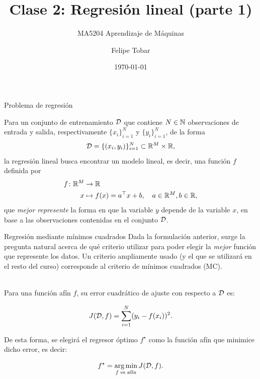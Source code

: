 \documentclass[handout, 9pt]{beamer}
\title{Clase 2: Regresión lineal (parte 1)}
\subtitle{MA5204 Aprendizaje de Máquinas}
\date{\today}
\author{Felipe Tobar}
\institute{Department of Mathematical Engineering \&\\ Center for Mathematical Modelling\\Universidad de Chile}
\begin{document}
\begin{frame}
  \titlepage
\end{frame}


\begin{frame}{Problema de regresión}
	
Para un conjunto de entrenamiento ${\mathcal D}$ que contiene $N\in{\mathbb N}$ observaciones de entrada y salida, respectivamente $\{x_i\}_{i=1}^N$ y $\{y_i\}_{i=1}^N$, de la forma
\begin{equation*}
	{\mathcal D}=\{(x_i,y_i)\}_{i=1}^N\subset \mathbb{R}^M \times \mathbb{R},
	\label{eq:training_set}
\end{equation*}\pause
la regresión lineal busca encontrar un modelo lineal, es decir, una función $f$ definida por 
\begin{align*}
  f \colon \mathbb{R}^M &\to \mathbb{R}\nonumber\\
  x &\mapsto f(x)=a^\top x + b,\quad a\in\mathbb{R}^M,b\in\mathbb{R},
\end{align*}
que \emph{mejor represente} la forma en que la variable $y$ depende de la variable $x$, en base a las observaciones contenidas en el conjunto ${\mathcal D}$.

\end{frame}

\begin{frame}{Regresión mediante mínimos cuadrados}
Dada la formulación anterior, surge la pregunta natural acerca de qué criterio utilizar para poder elegir la \emph{mejor} función que represente los datos. Un criterio ampliamente usado (y el que se utilizará en el resto del curso) corresponde al criterio de mínimos cuadrados (MC).\\~\ \pause

Para una función afín $f$, su error cuadrático de ajuste con respecto a ${\mathcal D}$ es:

\begin{equation*}
	J({\mathcal D},f) = \sum_{i=1}^N(y_i-f(x_i))^2.
	\label{eq:least_squares_cost}
\end{equation*}\pause

De esta forma, se elegirá el regresor óptimo $f^\star$ como la función afín que minimice dicho error, es decir:

\begin{equation*}
	f^\star = \operatorname*{arg\,min}_{f\text{ es afín}} J({\mathcal D},f).
\end{equation*}

\end{frame}
\end{document}
